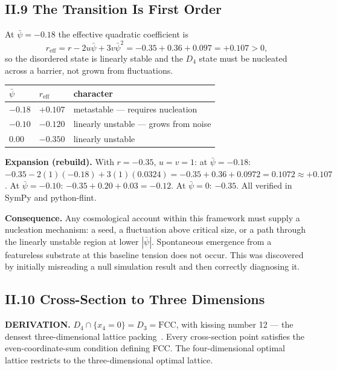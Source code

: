 \documentclass[11pt,a4paper]{article}
\newcommand{\expansion}[1]{\par\smallskip\noindent\textbf{Expansion (rebuild).} #1\par\smallskip}
\begin{document}
\subsection{II.9 The Transition Is First Order}
At $\bar{\psi} = -0.18$ the effective quadratic coefficient is
\begin{equation}
r_{\mathrm{eff}} = r - 2u\bar{\psi} + 3v\bar{\psi}^2 = -0.35 + 0.36 + 0.097 = +0.107 > 0,
\end{equation}
so the disordered state is linearly stable and the $D_4$ state must be nucleated across a barrier, not grown from fluctuations.
\begin{center}
\begin{tabular}{lll}
\toprule
$\bar{\psi}$ & $r_{\mathrm{eff}}$ & character \\
\midrule
$-0.18$ & $+0.107$ & metastable --- requires nucleation \\
$-0.10$ & $-0.120$ & linearly unstable --- grows from noise \\
$0.00$ & $-0.350$ & linearly unstable \\
\bottomrule
\end{tabular}
\end{center}
\expansion{With $r = -0.35$, $u = v = 1$: at $\bar{\psi} = -0.18$: $-0.35 - 2(1)(-0.18) + 3(1)(0.0324) = -0.35 + 0.36 + 0.0972 = 0.1072 \approx +0.107$. At $\bar{\psi} = -0.10$: $-0.35 + 0.20 + 0.03 = -0.12$. At $\bar{\psi} = 0$: $-0.35$. All verified in SymPy and python-flint.}
\textbf{Consequence.} Any cosmological account within this framework must supply a nucleation mechanism: a seed, a fluctuation above critical size, or a path through the linearly unstable region at lower $|\bar{\psi}|$. Spontaneous emergence from a featureless substrate at this baseline tension does not occur. This was discovered by initially misreading a null simulation result and then correctly diagnosing it.

\subsection{II.10 Cross-Section to Three Dimensions}
\textbf{DERIVATION.} $D_4 \cap \{x_4 = 0\} = D_3 = \mathrm{FCC}$, with kissing number 12 --- the densest three-dimensional lattice packing~\cite{conway1999}. Every cross-section point satisfies the even-coordinate-sum condition defining FCC. The four-dimensional optimal lattice restricts to the three-dimensional optimal lattice.
\end{document}
